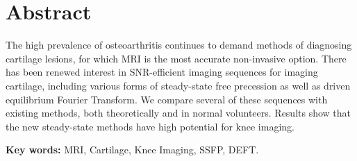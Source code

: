 
\section*{Abstract}
\setlength{\parindent}{0in}

The high prevalence of osteoarthritis continues to
demand methods of diagnosing cartilage lesions, for which 
MRI is the most accurate non-invasive option.
There has been renewed interest
in SNR-efficient imaging sequences for
imaging cartilage, including various forms of
steady-state free precession
as well as driven equilibrium Fourier Transform.  
We compare several of these sequences with existing
methods, both theoretically and in normal volunteers.  Results
show that the new steady-state methods have high potential for
knee imaging.


\vspace{0.5in}
\setlength{\parindent}{0in}
{\bf Key words:} MRI, Cartilage, Knee Imaging, SSFP, DEFT.
\newpage
